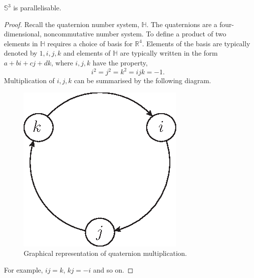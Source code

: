 \documentclass[12pt,a4paper]{article}
\begin{document}
\begin{proposition}
$\mathbb{S}^3$ is parallelisable.
\end{proposition}
\begin{proof}
Recall the quaternion number system, $\mathbb{H}$. The quaternions are a four-dimensional, noncommutative number system. To define a product of two elements in $\mathbb{H}$ requires a choice of basis for $\mathbb{R}^4$. Elements of the basis are typically denoted by $1,i,j,k$ and elements of $\mathbb{H}$ are typically written in the form $a+bi+cj+dk$, where $i,j,k$ have the property,
\[
i^2=j^2=k^2=ijk=-1.
\]
Multiplication of $i,j,k$ can be summarised by the following diagram.

\begin{figure}[h!]
\centering
\includegraphics[scale=1]{fig/quat-mult}
\caption{Graphical representation of quaternion multiplication.}
\label{fig:quat-mul}
\end{figure}

For example, $ij=k$, $kj=-i$ and so on.


\end{proof}
\end{document}
